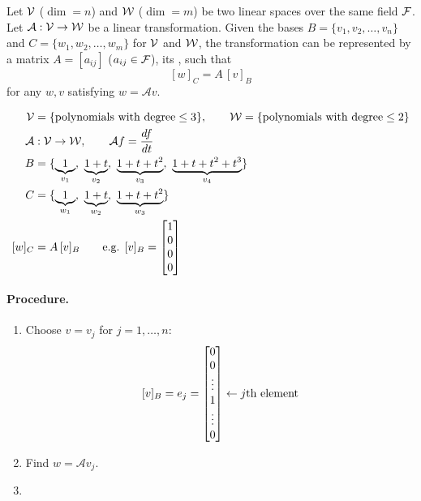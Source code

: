 \begin{definition}
Let $\mathcal{V}$ ($\dim=n$) and $\mathcal{W}$ ($\dim=m$) be two linear spaces over the same field $\mathcal{F}$.
Let $\mathcal{A}:\mathcal{V}\to\mathcal{W}$ be a linear transformation. Given the bases $B=\{v_1,v_2,\dots,v_n\}$ and $C=\{w_1,w_2,\dots,w_m\}$ for $\mathcal{V}$ and $\mathcal{W}$, the transformation can be represented by a matrix $A=[a_{ij}]$ ($a_{ij}\in\mathcal{F}$), its , such that
\[
[w]_C=A\,[v]_B
\]
for any $w,v$ satisfying $w=\mathcal{A}v$.
\end{definition}

\begin{example}\leavevmode{}
\begin{align*}
\V&=\{\text{polynomials with degree}\le 3\}, \qquad
\W=\{\text{polynomials with degree}\le 2\}\\
\mathcal{A}&:\V\to\W, \qquad \mathcal{A}f=\frac{df}{dt}\\
B&=\{\underbrace{1}_{v_1},\ \underbrace{1+t}_{v_2},\ \underbrace{1+t+t^2}_{v_3},\ \underbrace{1+t+t^2+t^3}_{v_4}\}\\
C&=\{\underbrace{1}_{w_1},\ \underbrace{1+t}_{w_2},\ \underbrace{1+t+t^2}_{w_3}\}\\
[w]_C&=A\,[v]_B \qquad\text{e.g. } [v]_B=\bmat{1\\0\\0\\0}
\end{align*}

\paragraph{Procedure.}
\begin{enumerate}[label=\arabic*.]
\item Choose $v=v_j$ for $j=1,\dots,n$:
\[
[v]_B=e_j=\begin{bmatrix}0\\0\\ \vdots\\ 1\\ \vdots\\ 0\end{bmatrix}\leftarrow j\text{th element}
\]
\item Find $w=\mathcal{A}v_j$.
\item {}
\end{enumerate}


\end{example}
